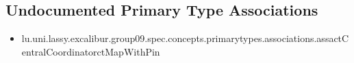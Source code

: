 \subsection[Undocumented Primary Type Associations]{Undocumented Primary Type Associations}
\begin{itemize}
\item lu.uni.lassy.excalibur.group09.spec.concepts.primarytypes.associations.assactCentralCoordinatorctMapWithPin 
\end{itemize}






















